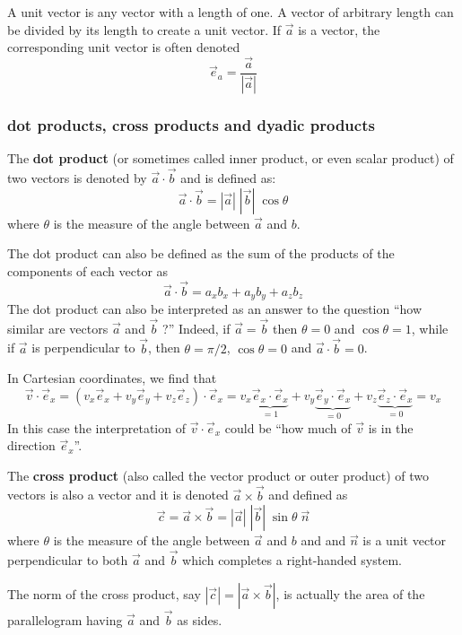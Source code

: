 A unit vector is any vector with a length of one. 
A vector of arbitrary length can be divided by its length to create a unit vector.
If $\vec{a}$ is a vector, the corresponding unit vector is often denoted
\[
\vec{e}_a = \frac{\vec{a}}{|\vec{a}|}
\]


\subsubsection{dot products, cross products and dyadic products}

The {\bf dot product} (or sometimes called inner product, or even scalar product) of two vectors is denoted by 
$\vec{a}\cdot \vec{b}$ and is defined as:
\[
\vec{a}\cdot \vec{b} = |\vec{a}| \; |\vec{b}| \; \cos\theta
\]
where $\theta$  is the measure of the angle between $\vec{a}$ and ${b}$.


The dot product can also be defined as the sum of the products of the components of each vector as
\[
\vec{a}\cdot\vec{b} = a_xb_x + a_yb_y + a_zb_z  
\]
The dot product can also be interpreted as an answer to the question ``how similar are vectors $\vec{a}$
and $\vec{b}$ ?'' Indeed, if $\vec{a}=\vec{b}$ then $\theta=0$ and $\cos\theta=1$, while if 
$\vec{a}$ is perpendicular to $\vec{b}$, then $\theta=\pi/2$, $\cos\theta=0$ and $\vec{a}\cdot \vec{b}=0$. 

In Cartesian coordinates, we find that 
\[
\vec{v} \cdot \vec{e}_x 
= (v_x \vec{e}_x + v_y \vec{e}_y + v_z \vec{e}_z ) \cdot \vec{e}_x
= v_x \underbrace{\vec{e}_x \cdot \vec{e}_x}_{=1}
+ v_y \underbrace{\vec{e}_y \cdot \vec{e}_x}_{=0}
+ v_z \underbrace{\vec{e}_z \cdot \vec{e}_x}_{=0} 
=v_x
\]
In this case the interpretation of $\vec{v} \cdot \vec{e}_x$ could be ``how much of $\vec{v}$
is in the direction $\vec{e}_x$''.

The {\bf cross product} (also  called the vector product or outer product) of two vectors is also a vector and 
it is denoted $\vec{a} \times \vec{b}$ and defined as 
\[
\vec{c} = \vec{a} \times \vec{b} = |\vec{a}| \; |\vec{b}|\; \sin\theta \; \vec{n}
\]
where $\theta$  is the measure of the angle between $\vec{a}$ and ${b}$ and
and $\vec{n}$ is a unit vector perpendicular to both $\vec{a}$ and $\vec{b}$ 
which completes a right-handed system.


The norm of the cross product, say $|\vec{c}|=|\vec{a} \times \vec{b}|$, is actually the 
area of the parallelogram having $\vec{a}$ and $\vec{b}$ as sides.

